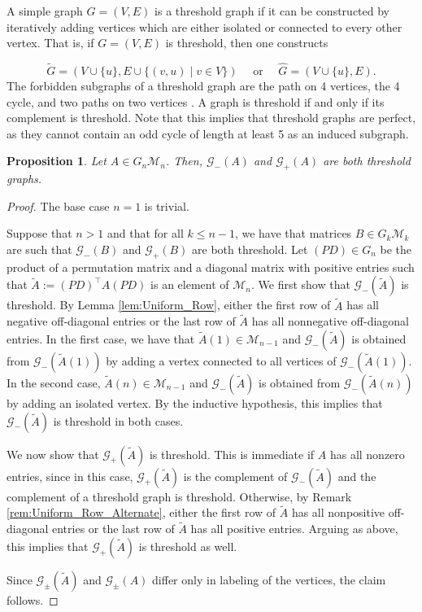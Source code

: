 \documentclass{amsart}
\newcommand{\cM}{\mathcal{M}}
\newcommand{\cG}{\mathcal{G}}
\newtheorem{proposition}[theorem]{Proposition}
\theoremstyle{definition}
\begin{document}
A simple graph $G = (V,E)$ is a threshold graph \cite{chvatal_aggregation_1977} if it can be constructed by iteratively adding vertices which are either isolated or connected to every other vertex. That is, if $G = (V,E)$ is threshold, then one constructs 

\[\tilde{G} = \left(V\cup \{u\}, E \cup \{(v,u)\; \vert \; v \in V\}\right) \quad \text{ or } \quad \widehat{G} = (V\cup \{u\}, E).\]
%
The forbidden subgraphs of a threshold graph are the path on 4 vertices, the 4 cycle, and two paths on two vertices \cite{chvatal_aggregation_1977}. A graph is threshold if and only if its complement is threshold. Note that this implies that threshold graphs are perfect, as they cannot contain an odd cycle of length at least 5 as an induced subgraph. 

\begin{proposition}\label{prop:SignGraphThreshold}
Let $A \in G_n\cM_n$. Then, $\cG_{-}(A)$ and $\cG_{+}(A)$ are both threshold graphs. 
\end{proposition}

\begin{proof}
 The base case $n = 1$ is trivial. 
 
Suppose that $n > 1$ and that for all $k \leq n-1$, we have that matrices $B \in G_k\cM_k$ are such that $\cG_{-}(B)$ and $\cG_{+}(B)$ are both threshold.
Let $(PD) \in G_n$ be the product of a permutation matrix and a diagonal matrix with positive entries such that $\tilde{A}:= (PD)^\top A (PD)$ is an element of $\cM_n$. We first show that $\cG_{-}(\tilde{A})$ is threshold.  By Lemma \ref{lem:Uniform_Row}, either the first row of $\tilde{A}$ has all negative off-diagonal entries or the last row of $\tilde{A}$ has all nonnegative off-diagonal entries. In the first case, we have that $\tilde{A}(1) \in \cM_{n-1}$ and $\cG_{-}(\tilde{A})$ is obtained from $\cG_{-}(\tilde{A}(1))$ by adding a vertex connected to all vertices of $\cG_{-}(\tilde{A}(1))$. In the second case, $\tilde{A}(n) \in \cM_{n-1}$ and $\cG_{-}(\tilde{A})$ is obtained from $\cG_{-}(\tilde{A}(n))$ by adding an isolated vertex. By the inductive hypothesis, this implies that $\cG_{-}(\tilde{A})$ is threshold in both cases. 

We now show that $\cG_{+}(\tilde{A})$ is threshold. This is immediate if $A$ has all nonzero entries, since in this case, $\cG_{+}(\tilde{A})$ is the complement of $\cG_{-}(\tilde{A})$ and the complement of a threshold graph is threshold. Otherwise, by Remark \ref{rem:Uniform_Row_Alternate}, either the first row of $\tilde{A}$ has all nonpositive off-diagonal entries or the last row of $\tilde{A}$ has all positive entries. Arguing as above, this implies that $\cG_{+}(\tilde{A})$ is threshold as well. 

Since $\cG_{\pm}(\tilde{A})$ and $\cG_{\pm}(A)$ differ only in labeling of the vertices, the claim follows. 
\end{proof}
\end{document}
